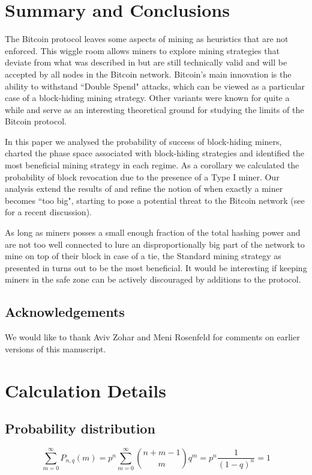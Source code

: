 \documentclass[letterpaper,12pt]{report}
\begin{document}
\chapter{Summary and Conclusions}
The Bitcoin protocol leaves some aspects of mining as heuristics that are not enforced. This wiggle room allows miners to explore mining strategies that deviate from what was described in \cite{Bitcoin} but are still technically valid and will be accepted by all nodes in the Bitcoin network. Bitcoin's  main innovation is the ability to withstand ``Double Spend" attacks, which can be viewed as a particular case of a block-hiding mining strategy. Other variants were known for quite a while \cite{Lear,Selfish} and serve as an interesting theoretical ground for studying the limits of the Bitcoin protocol. 
 
In this paper we analysed the probability of success of block-hiding miners, charted the phase space  associated with block-hiding strategies and identified the most beneficial mining strategy in each regime. As a corollary we calculated the probability of block revocation due to the presence of a Type I miner. Our analysis extend the results of \cite{Selfish} and refine the notion of when exactly a miner becomes ``too big", starting to pose a potential threat to the Bitcoin network (see \cite{Centralization} for a recent discussion). 

As long as miners posses a small enough fraction of the total hashing power and are not too well connected to lure an disproportionally big part of the network to mine on top of their block in case of a tie, the Standard mining strategy as presented in \cite{Bitcoin} turns out to be the most beneficial. It would be interesting if keeping miners in the safe zone can be actively discouraged by additions to the protocol.

\section{Acknowledgements}
We would like to thank Aviv Zohar and Meni Rosenfeld for comments on earlier versions of this manuscript.

\appendix
\chapter{Calculation Details}
\section{Probability distribution} \label{app:probmath}
\begin{equation}\nonumber
\sum_{m=0}^{\infty}\mathit{P}_{n,q}(m)=p^n\sum_{m=0}^{\infty}{n + m -1\choose m}q^m=p^n\dfrac{1}{(1-q)^n}=1
\end{equation}
\end{document}
